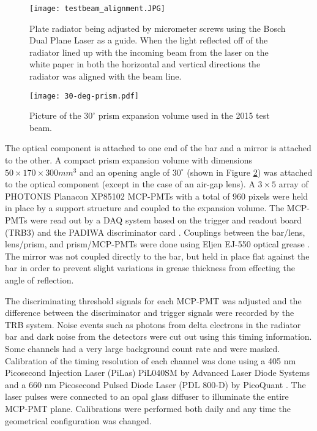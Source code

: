 \begin{figure}[!htb]
	\centering
	\texttt{[image: testbeam\_alignment.JPG]}
	\caption{Plate radiator being adjusted by micrometer screws using the Bosch Dual Plane Laser as a guide. When the light reflected off of the radiator lined up with the incoming beam from the laser on the white paper in both the horizontal and vertical directions the radiator was aligned with the beam line.}
	\label{fig:testbeam_alignment}
\end{figure}

\begin{figure}[!htb]
	\centering
	\texttt{[image: 30-deg-prism.pdf]}
	\caption{Picture of the $30^{\circ}$ prism expansion volume used in the 2015 test beam.}
	\label{fig:prototype_prism}
\end{figure}

The optical component is attached to one end of the bar and a mirror is attached to the other. A compact prism expansion volume with dimensions $50\times170\times300\unit{mm}^3$ and an opening angle of $30^\circ$ (shown in Figure \ref{fig:prototype_prism}) was attached to the optical component (except in the case of an air-gap lens). A $3\times5$ array of PHOTONIS Planacon XP85102 MCP-PMTs with a total of 960 pixels were held in place by a support structure and coupled to the expansion volume. The MCP-PMTs were read out by a DAQ system based on the trigger and readout board (TRB3) and the PADIWA discriminator card \cite{PANDA_electronics}. Couplings between the bar/lens, lens/prism, and prism/MCP-PMTs were done using Eljen EJ-550 optical grease \cite{EljenTech}. The mirror was not coupled directly to the bar, but held in place flat against the bar in order to prevent slight variations in grease thickness from effecting the angle of reflection.

The discriminating threshold signals for each MCP-PMT was adjusted and the difference between the discriminator and trigger signals were recorded by the TRB system. Noise events such as photons from delta electrons in the radiator bar and dark noise from the detectors were cut out using this timing information. Some channels had a very large background count rate and were masked. Calibration of the timing resolution of each channel was done using a 405 nm Picosecond Injection Laser (PiLas) PiL040SM by Advanced Laser Diode Systems \cite{PiLas} and a 660 nm Picosecond Pulsed Diode Laser (PDL 800-D) by PicoQuant \cite{PicoQuant}. The laser pulses were connected to an opal glass diffuser to illuminate the entire MCP-PMT plane. Calibrations were performed both daily and any time the geometrical configuration was changed.

